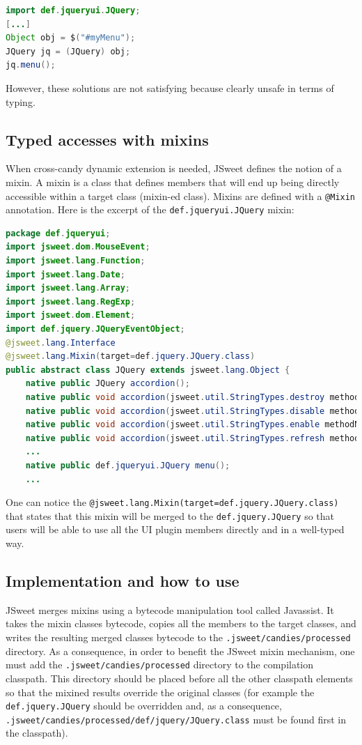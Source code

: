 \documentclass[a4paper]{report}
\begin{document}
\begin{lstlisting}[language=Java]
import def.jqueryui.JQuery;
[...]
Object obj = $("#myMenu");
JQuery jq = (JQuery) obj;
jq.menu();
\end{lstlisting}

However, these solutions are not satisfying because clearly unsafe in terms of typing.

\subsection{Typed accesses with mixins}

When cross-candy dynamic extension is needed, JSweet defines the notion of a mixin. A mixin is a class that defines members that will end up being directly accessible within a target class (mixin-ed class). Mixins are defined with a \texttt{@Mixin} annotation. Here is the excerpt of the \texttt{def.jqueryui.JQuery} mixin:

\begin{lstlisting}[language=Java]
package def.jqueryui;
import jsweet.dom.MouseEvent;
import jsweet.lang.Function;
import jsweet.lang.Date;
import jsweet.lang.Array;
import jsweet.lang.RegExp;
import jsweet.dom.Element;
import def.jquery.JQueryEventObject;
@jsweet.lang.Interface
@jsweet.lang.Mixin(target=def.jquery.JQuery.class)
public abstract class JQuery extends jsweet.lang.Object {
    native public JQuery accordion();
    native public void accordion(jsweet.util.StringTypes.destroy methodName);
    native public void accordion(jsweet.util.StringTypes.disable methodName);
    native public void accordion(jsweet.util.StringTypes.enable methodName);
    native public void accordion(jsweet.util.StringTypes.refresh methodName);
    ...
    native public def.jqueryui.JQuery menu();
    ...
\end{lstlisting}

One can notice the \texttt{@jsweet.lang.Mixin(target=def.jquery.JQuery.class)} that states that this mixin will be merged to the \texttt{def.jquery.JQuery} so that users will be able to use all the UI plugin members directly and in a well-typed way.

\subsection{Implementation and how to use}

JSweet merges mixins using a bytecode manipulation tool called Javassist. It takes the mixin classes bytecode, copies all the members to the target classes, and writes the resulting merged classes bytecode to the \texttt{.jsweet/candies/processed} directory. As a consequence, in order to benefit the JSweet mixin mechanism, one must add the \texttt{.jsweet/candies/processed} directory to the compilation classpath. This directory should be placed before all the other classpath elements so that the mixined results override the original classes (for example the \texttt{def.jquery.JQuery} should be overridden and, as a consequence, \texttt{.jsweet/candies/processed/def/jquery/JQuery.class} must be found first in the classpath).
\end{document}
